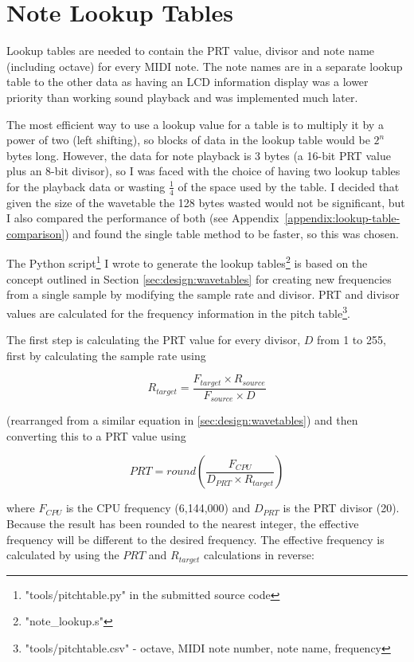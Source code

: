 \section{Note Lookup Tables}
\label{sec:design:lookup-tables}

Lookup tables are needed to contain the PRT value, divisor and note name (including octave) for 
every MIDI note.  The note names are in a separate lookup table to the other data as having an LCD 
information display was a lower priority than working sound playback and was implemented much later.

The most efficient way to use a lookup value for a table is to multiply it by a power of two (left 
shifting), so blocks of data in the lookup table would be $2^n$ bytes long.  However, the data for 
note playback is 3 bytes (a 16-bit PRT value plus an 8-bit divisor), so I was faced with the choice 
of having two lookup tables for the playback data or wasting $\frac{1}{4}$ of the space used by the 
table.  I decided that given the size of the wavetable the 128 bytes wasted would not be 
significant, but I also compared the performance of both (see 
Appendix~\ref{appendix:lookup-table-comparison}) and found the single table method to be faster, so 
this was chosen.

The Python script\footnote{"tools/pitchtable.py" in the submitted source code} I wrote to generate 
the lookup tables\footnote{"note\_lookup.s"} is based on the concept outlined in Section 
\ref{sec:design:wavetables} for creating new frequencies from a single sample by modifying the 
sample rate and divisor.  PRT and divisor values are calculated for the frequency information in the 
pitch table\footnote{"tools/pitchtable.csv" - octave, MIDI note number, note name, frequency}.

The first step is calculating the PRT value for every divisor, $D$ from 1 to 255, first by 
calculating the sample rate using

\[R_{target} = \frac{F_{target} \times R_{source}}{F_{source} \times D}\]

(rearranged from a similar equation in \ref{sec:design:wavetables}) and then converting this to a 
PRT value using

\[PRT = round\left(\frac{F_{CPU}}{D_{PRT}\times{}R_{target}}\right)\]

where $F_{CPU}$ is the CPU frequency (6,144,000) and $D_{PRT}$ is the PRT divisor (20).  Because the 
result has been rounded to the nearest integer, the effective frequency will be different to the 
desired frequency.  The effective frequency is calculated by using the $PRT$ and $R_{target}$ 
calculations in reverse:

